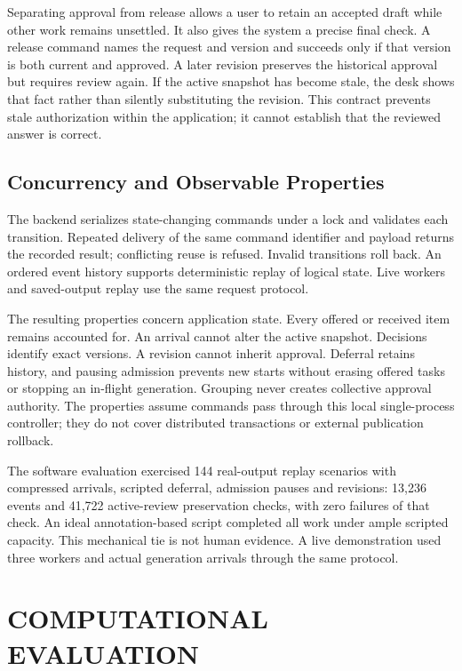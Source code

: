 \documentclass[a4paper,twoside]{article}
\begin{document}
Separating approval from release allows a user to retain an accepted draft while other work remains unsettled. It also gives the system a precise final check. A release command names the request and version and succeeds only if that version is both current and approved. A later revision preserves the historical approval but requires review again. If the active snapshot has become stale, the desk shows that fact rather than silently substituting the revision. This contract prevents stale authorization within the application; it cannot establish that the reviewed answer is correct.

\subsection{Concurrency and Observable Properties}
The backend serializes state-changing commands under a lock and validates each transition. Repeated delivery of the same command identifier and payload returns the recorded result; conflicting reuse is refused. Invalid transitions roll back. An ordered event history supports deterministic replay of logical state. Live workers and saved-output replay use the same request protocol.

The resulting properties concern application state. Every offered or received item remains accounted for. An arrival cannot alter the active snapshot. Decisions identify exact versions. A revision cannot inherit approval. Deferral retains history, and pausing admission prevents new starts without erasing offered tasks or stopping an in-flight generation. Grouping never creates collective approval authority. The properties assume commands pass through this local single-process controller; they do not cover distributed transactions or external publication rollback.

The software evaluation exercised 144 real-output replay scenarios with compressed arrivals, scripted deferral, admission pauses and revisions: 13,236 events and 41,722 active-review preservation checks, with zero failures of that check. An ideal annotation-based script completed all work under ample scripted capacity. This mechanical tie is not human evidence. A live demonstration used three workers and actual generation arrivals through the same protocol.

\section{COMPUTATIONAL EVALUATION}
\label{sec:model}
\end{document}
